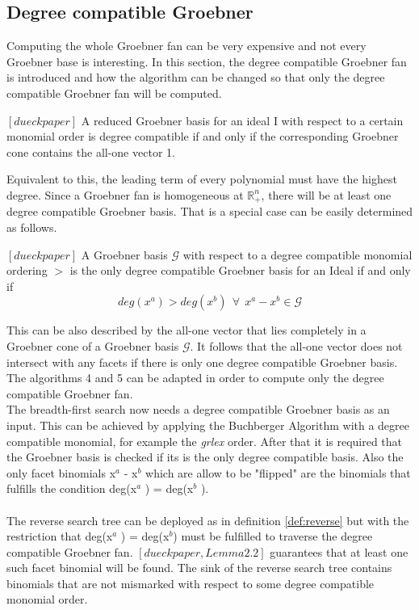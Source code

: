 \subsection{Degree compatible Groebner}
\label{subsec:degreecomp}
Computing the whole Groebner fan can be very expensive and not every Groebner base is interesting.
In this section, the degree compatible Groebner fan is introduced and how the algorithm can
be changed so that only the degree compatible Groebner fan will be computed.\\
\begin{env_definition}
$[dueck paper] $
A reduced Groebner basis for an ideal I with respect to a certain monomial order is
degree compatible if and only if the corresponding Groebner cone contains the all-one vector 1.
\end{env_definition}
Equivalent to this, the leading term of every polynomial must have the highest degree.
Since a Groebner fan is homogeneous at $\mathbb{R}^{n}_{+}$, there will be at least one degree compatible Groebner basis.
That is a special case can be easily determined as follows.

\begin{env_definition}
$[dueck paper] $
A Groebner basis $\mathcal{G}$ with respect to a degree compatible monomial ordering $>$  is the only degree compatible Groebner basis for an Ideal if and only if
\[ deg(x^{a}) > deg(x^{b})~~ \forall~~ x^{a}-x^{b}\in \mathcal{G} \] 
\end{env_definition}

This can be also described by the all-one vector that lies completely in a Groebner cone of a Groebner basis $\mathcal{G}$.
It follows that the all-one vector does not intersect with any facets if there is only one degree compatible Groebner basis. \\

The algorithms 4 and 5 can be adapted in order to compute only the degree compatible Groebner fan.\\ 
The breadth-first search now needs a degree compatible Groebner basis as an input. This can be achieved by applying the Buchberger Algorithm with a degree compatible monomial, for example the \textit{grlex} order. After that it is required that the Groebner basis is checked if its is the only degree compatible basis. %
Also the only facet binomials x$^{a}$ - x$^{b}$ which are allow to be "flipped" are the binomials that fulfills the condition
deg(x$^{a}$ ) = deg(x$^{b} $ ). \\ \\
The reverse search tree can be deployed as in definition \ref{def:reverse} but with the restriction that deg(x$^{a}$ ) = deg(x$^{b}$) must be fulfilled to traverse the degree compatible Groebner fan.
$[dueckpaper, Lemma 2.2]$ guarantees that at least one such facet binomial will be found. 
The sink of the reverse search tree contains binomials that are not mismarked with respect to some degree compatible monomial order. 

